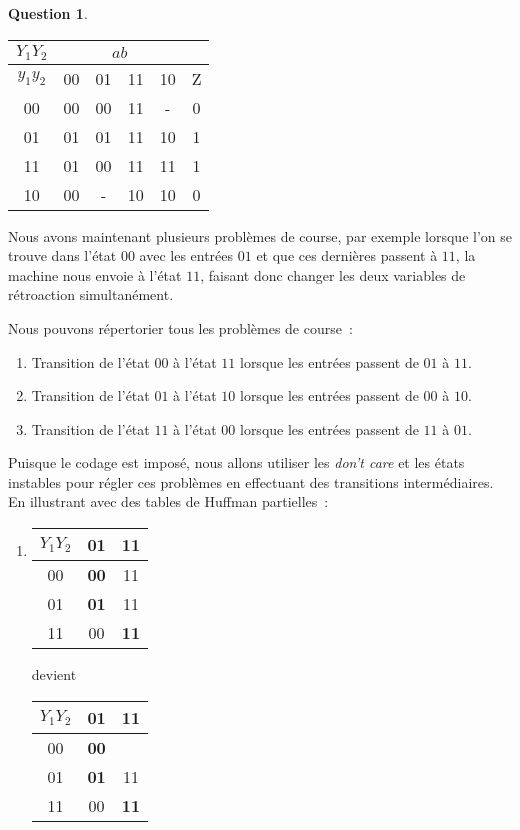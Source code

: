 \documentclass[11pt,a4paper]{article}
\theoremstyle{definition}%
\newtheorem{Q}{Question}[] %
\begin{document}
\begin{Q}
\begin{enumerate}
{		\begin{center}
			\begin{tabular}{|c|c|c|c|c|c|}\hline
			$Y_1Y_2$ & \multicolumn{4}{c|}{$ab$} & \\ \hline
			$y_1y_2$ & 00 & 01 & 11 & 10 & Z \\ \hline
			00       & 00 & 00 & {\color{red}11} & -  & 0 \\ \hline
			01       & 01 & 01 & 11 & {\color{red}10} & 1 \\ \hline
			11       & 01 & {\color{red}00} & 11 & 11 & 1 \\ \hline
			10       & 00 & -  & 10 & 10 & 0 \\ \hline
			\end{tabular}
		\end{center}


		Nous avons maintenant plusieurs problèmes de course, par exemple lorsque l'on se trouve dans l'état $00$ avec les entrées $01$ et que ces dernières passent à $11$, la machine nous envoie à l'état $11$, faisant donc changer les deux variables de rétroaction simultanément.

		Nous pouvons répertorier tous les problèmes de course~:
		\begin{enumerate}
			\item Transition de l'état $00$ à l'état $11$ lorsque les entrées passent de $01$ à $11$.
			\item Transition de l'état $01$ à l'état $10$ lorsque les entrées passent de $00$ à $10$.
			\item Transition de l'état $11$ à l'état $00$ lorsque les entrées passent de $11$ à $01$.
		\end{enumerate}

		Puisque le codage est imposé, nous allons utiliser les \textit{don't care} et les états instables pour régler ces problèmes en effectuant des transitions intermédiaires.
		En illustrant avec des tables de Huffman partielles~:
		\begin{enumerate}
			\item 
				\begin{tabular}{|c|c|c|}\hline
				$Y_1Y_2$ & 01 & 11 \\ \hline
				00 & \textbf{00} & 11 \\ \hline
				01 & \textbf{01} & 11 \\ \hline
				11 & 00 & \textbf{11} \\ \hline
				\end{tabular}
				devient
				\begin{tabular}{|c|c|c|}\hline
				$Y_1Y_2$ & 01 & 11 \\ \hline
				00 & \textbf{00} & \color{green}{01} \\ \hline
				01 & \textbf{01} & 11 \\ \hline
				11 & 00 & \textbf{11} \\ \hline
				\end{tabular}


\end{enumerate}}
\end{enumerate}
\end{Q}
\end{document}
